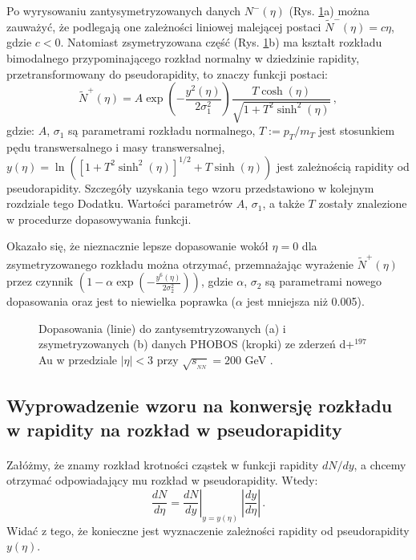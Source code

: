\documentclass[a4paper,12pt]{article}
\begin{document}
Po wyrysowaniu zantysymetryzowanych danych $N^-(\eta)$ (Rys. \ref{fig:Nmp}a) można zauważyć, że podlegają one zależności liniowej malejącej postaci $\widetilde{N}^-(\eta) = c\eta$, gdzie $c < 0$. Natomiast zsymetryzowana część (Rys. \ref{fig:Nmp}b) ma kształt rozkładu bimodalnego przypominającego rozkład normalny w dziedzinie rapidity, przetransformowany do pseudorapidity, to znaczy funkcji postaci:
\begin{equation}\label{eq:fit-symmetr}
\widetilde{N}^+(\eta) = A \exp \left(- \frac{y^2(\eta)}{2 \sigma_1^2} \right) \frac{T \cosh(\eta)}{\sqrt{1 + T^2 \sinh^2(\eta)}}\,,
\end{equation}
gdzie: $A$, $\sigma_1$ są parametrami rozkładu normalnego, $T := p_T/m_T$ jest stosunkiem pędu transwersalnego i masy transwersalnej, $y(\eta) = \ln\left([1 + T^2 \sinh^2(\eta)]^{1/2} + T \sinh(\eta)\right)$ jest zależnością rapidity od pseudorapidity. Szczegóły uzyskania tego wzoru przedstawiono w kolejnym rozdziale tego Dodatku. Wartości parametrów $A$, $\sigma_1$, a także $T$ zostały znalezione w procedurze dopasowywania funkcji.

Okazało się, że nieznacznie lepsze dopasowanie wokół $\eta = 0$ dla zsymetryzowanego rozkładu można otrzymać, przemnażając wyrażenie $\widetilde{N}^+(\eta)$ przez czynnik $\left(1 - \alpha\exp\left(- \frac{y^6(\eta)}{2\sigma_2^2}\right)\right)$, gdzie $\alpha$, $\sigma_2$ są parametrami nowego dopasowania oraz jest to niewielka poprawka ($\alpha$ jest mniejsza niż 0.005).

\begin{figure}[H]
\begin{center}
%
\hspace{0.5cm}
%
\caption{Dopasowania (linie) do zantysemtryzowanych (a) i zsymetryzowanych (b) danych PHOBOS (kropki) ze zderzeń d+$^{197}$Au w przedziale $|\eta| < 3$ przy $\sqrt{s_{_{NN}}}=200$ GeV \cite{Back:2004mr}.}\label{fig:Nmp}
\end{center}
\end{figure}


\subsection{Wyprowadzenie wzoru na konwersję rozkładu w rapidity na rozkład w pseudorapidity}
\paragraph{}
Załóżmy, że znamy rozkład krotności cząstek w funkcji rapidity $dN/dy$, a chcemy otrzymać odpowiadający mu rozkład w pseudorapidity. Wtedy:
\begin{equation}\label{eq:conversion-y-eta}
 \frac{dN}{d\eta} = \left. \frac{dN}{dy} \right|_{y = y(\eta)} \: \left| \frac{dy}{d\eta} \right|\,.
\end{equation}
Widać z tego, że konieczne jest wyznaczenie zależności rapidity od pseudorapidity $y(\eta)$.
\end{document}
